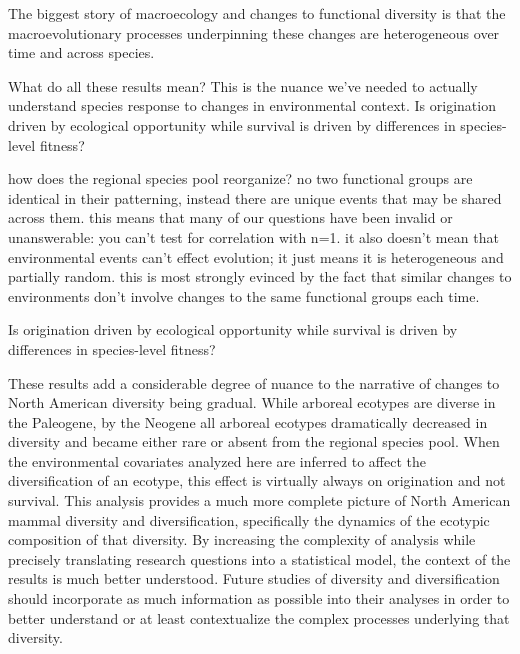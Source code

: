\documentclass[12pt,letterpaper]{article}
\begin{document}
The biggest story of macroecology and changes to functional diversity is that the macroevolutionary processes underpinning these changes are heterogeneous over time and across species. 

What do all these results mean? This is the nuance we've needed to actually understand species response to changes in environmental context. Is origination driven by ecological opportunity while survival is driven by differences in species-level fitness?

how does the regional species pool reorganize? no two functional groups are identical in their patterning, instead there are unique events that may be shared across them. this means that many of our questions have been invalid or unanswerable: you can't test for correlation with n=1. it also doesn't mean that environmental events can't effect evolution; it just means it is heterogeneous and partially random. this is most strongly evinced by the fact that similar changes to environments don't involve changes to the same functional groups each time.


Is origination driven by ecological opportunity while survival is driven by differences in species-level fitness?

These results add a considerable degree of nuance to the narrative of changes to North American diversity being gradual. 
While arboreal ecotypes are diverse in the Paleogene, by the Neogene all arboreal ecotypes dramatically decreased in diversity and became either rare or absent from the regional species pool. 
When the environmental covariates analyzed here are inferred to affect the diversification of an ecotype, this effect is virtually always on origination and not survival. This analysis provides a much more complete picture of North American mammal diversity and diversification, specifically the dynamics of the ecotypic composition of that diversity. By increasing the complexity of analysis while precisely translating research questions into a statistical model, the context of the results is much better understood. Future studies of diversity and diversification should incorporate as much information as possible into their analyses in order to better understand or at least contextualize the complex processes underlying that diversity.
\end{document}
